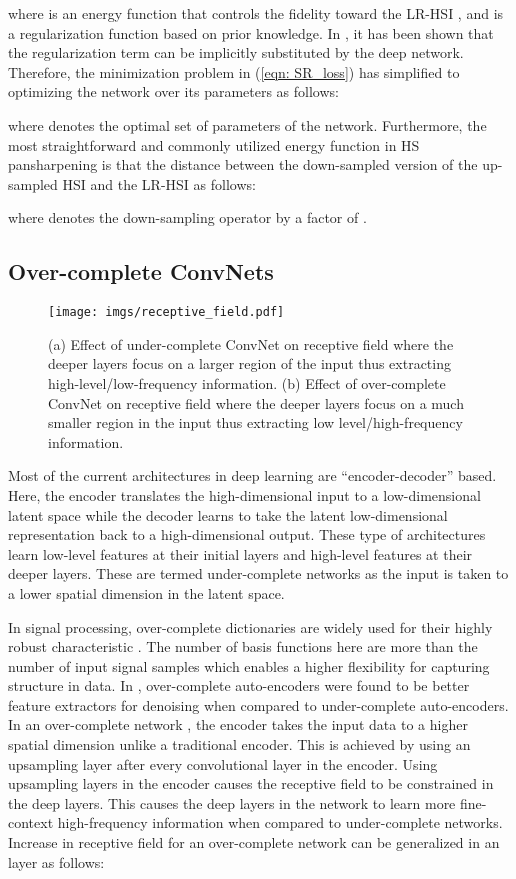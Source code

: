 \documentclass[journal]{IEEEtran}
\begin{document}
    where  is an energy function that controls the fidelity toward the LR-HSI , and  is a regularization function based on prior knowledge. In \cite{DeepImagePrior}, it has been shown that the regularization term  can be implicitly substituted by the deep network. Therefore, the minimization problem in (\ref{eqn: SR_loss}) has simplified to optimizing the network over its parameters  as follows:
    
    where denotes the optimal set of parameters of the network. Furthermore, the most straightforward and commonly utilized energy function in HS pansharpening is that the  distance \cite{Hyper-PNN} between the down-sampled version of the up-sampled HSI  and the LR-HSI  as follows:
    
    where  denotes the down-sampling operator by a factor of . 


\subsection{Over-complete ConvNets}
\begin{figure}[tb]
    \centering
    \texttt{[image: imgs/receptive\_field.pdf]}
    \caption{(a) Effect of under-complete ConvNet on receptive field where the deeper layers focus on a larger region of the input thus extracting high-level/low-frequency information. (b) Effect of over-complete ConvNet on receptive field where the deeper layers focus on a much smaller region in the input thus extracting low level/high-frequency information.}
    \label{fig:receptive_field}
\end{figure}
 Most of the current architectures in deep learning are  ``encoder-decoder'' \cite{ronneberger2015u, badrinarayanan2017segnet, he2016deep} based. Here, the encoder  translates the high-dimensional input to a low-dimensional latent space  while the decoder learns to take the latent low-dimensional representation back to a high-dimensional output.  These type of architectures learn low-level features at their initial layers and high-level features at their deeper layers. These are termed under-complete networks as the input is taken to a lower spatial dimension in the latent space.
 
 In signal processing, over-complete dictionaries are widely used for their highly robust characteristic \cite{lewicki2000learning}. The number of basis functions  here are more than the number of input signal samples which enables a higher flexibility for capturing structure in data. In \cite{vincent2008extracting}, over-complete auto-encoders were  found to be better feature extractors for denoising when compared to under-complete auto-encoders. In an over-complete network \cite{valanarasu2020kiu}, the encoder takes the input data to a higher spatial dimension unlike a traditional encoder. This is achieved by using an upsampling layer after every convolutional layer in the encoder. Using upsampling layers in the encoder causes the receptive field to be constrained in the deep layers. This causes the deep layers in the network to learn more fine-context high-frequency information when compared to under-complete networks. Increase in receptive field for an over-complete network can be generalized in an  layer  as follows:  
 
\end{document}
